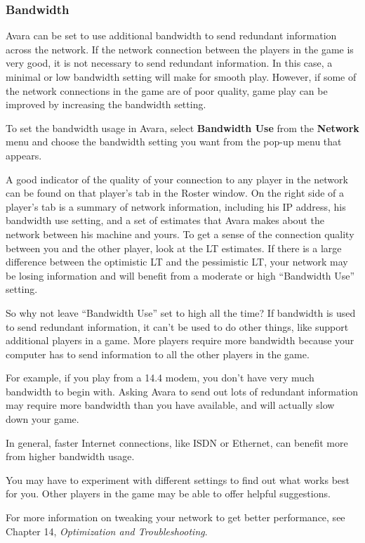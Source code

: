 \documentclass{article}
\begin{document}
\subsubsection{Bandwidth}
Avara can be set to use additional bandwidth to send redundant information across the network. If the network connection between the players in the game is very good, it is not necessary to send redundant information. In this case, a minimal or low bandwidth setting will make for smooth play. However, if some of the network connections in the game are of poor quality, game play can be improved by increasing the bandwidth setting.

To set the bandwidth usage in Avara, select \textbf{Bandwidth Use} from the \textbf{Network} menu and choose the bandwidth setting you want from the pop-up menu that appears.

A good indicator of the quality of your connection to any player in the network can be found on that player's tab in the Roster window. On the right side of a player's tab is a summary of network information, including his IP address, his bandwidth use setting, and a set of estimates that Avara makes about the network between his machine and yours. To get a sense of the connection quality between you and the other player, look at the LT estimates. If there is a large difference between the optimistic LT and the pessimistic LT, your network may be losing information and will benefit from a moderate or high ``Bandwidth Use'' setting.

So why not leave ``Bandwidth Use'' set to high all the time? If bandwidth is used to send redundant information, it can't be used to do other things, like support additional players in a game. More players require more bandwidth because your computer has to send information to all the other players in the game.

For example, if you play from a 14.4 modem, you don't have very much bandwidth to begin with. Asking Avara to send out lots of redundant information may require more bandwidth than you have available, and will actually slow down your game.

In general, faster Internet connections, like ISDN or Ethernet, can benefit more from higher bandwidth usage.

You may have to experiment with different settings to find out what works best for you. Other players in the game may be able to offer helpful suggestions.

For more information on tweaking your network to get better performance, see Chapter 14, \textit{Optimization and Troubleshooting}.
\end{document}
